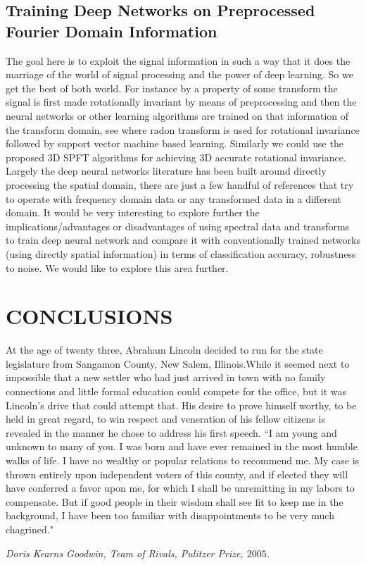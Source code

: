\documentclass{UCF_ETD}
\begin{document}
\section{Training Deep Networks on Preprocessed Fourier Domain Information}

The goal here is to exploit the signal information in such a way that it does the marriage of the world of signal processing and the power of deep learning. So we get the best of both world. For instance by a property of some transform the signal is first made rotationally invariant by means of preprocessing and then the neural networks or other learning algorithms are trained on that information of the transform domain, see \cite{Chen2013} where radon transform is used for rotational invariance followed by support vector machine based learning. Similarly we could use the proposed $3$D SPFT algorithms for achieving $3$D accurate rotational invariance. Largely the deep neural networks literature has been built around directly processing the spatial domain, there are just a few handful of references that try to operate with frequency domain data or any transformed data in a different domain. It would be very interesting to explore further the implications/advantages or disadvantages of using spectral data and transforms to train deep neural network and compare it with conventionally trained networks (using directly spatial information) in terms of classification accuracy, robustness to noise. We would like to explore this area further.


\chapter{CONCLUSIONS}

\epigraph{
At the age of twenty three, Abraham Lincoln decided to run for the state legislature from Sangamon County, New Salem, Illinois.While it seemed next to impossible that a new settler who had just arrived in town with no family connections and little formal education could compete for the office, but it was Lincoln's drive that could attempt that. His desire to prove himself worthy, to be held in great regard, to win respect and veneration of his fellow citizens is revealed in the manner he chose to address his first speech. ``I am young and unknown to many of you. I was born and have ever remained in the most humble walks of life. I have no wealthy or popular relations to recommend me. My case is thrown entirely upon independent voters of this county, and if elected they will have conferred a favor upon me, for which I shall be unremitting in my labors to compensate. But if good people in their wisdom shall see fit to keep me in the background, I have been too familiar with disappointments to be very much chagrined."}{\itshape Doris Kearns Goodwin, Team of Rivals, Pulitzer Prize, $2005$.}
\end{document}
